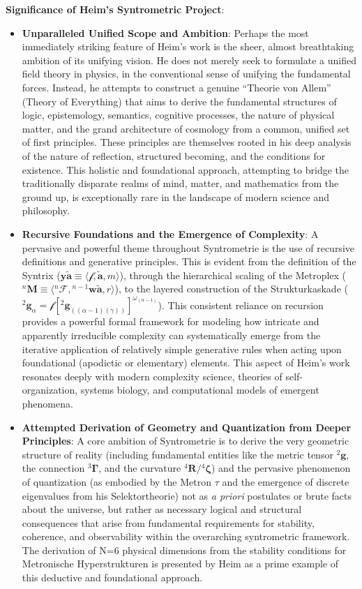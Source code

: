 \documentclass[12pt]{article}
\newcommand{\syntrix}{\bm{y\widetilde{a}}}
\newcommand{\metrophor}{\bm{\widetilde{a}}}
\newcommand{\synkolator}{\mathcal{f}}
\newcommand{\synkolationsstufe}{m}
\newcommand{\metroplex}[1]{{}^{#1}\mathbf{M}}
\newcommand{\hypermetrophor}[1]{{}^{#1}\mathbf{w\widetilde{a}}}
\newcommand{\metroplexsynkolator}[1]{{}^{#1}\mathcal{F}}
\newcommand{\kompositionsfeld}{{}^2\mathbf{g}}
\newcommand{\partialstruktur}[1]{{}^2\mathbf{g}_{(#1)}} %
\newcommand{\fundamentalkondensor}{{}^3\bm{\Gamma}}
\newcommand{\metron}{\tau}
\newcommand{\strukturkompressor}{{}^4\bm{\zeta}}
\begin{document}
\textbf{Significance of Heim's Syntrometric Project}:
\begin{itemize}
    \item \textbf{Unparalleled Unified Scope and Ambition}: Perhaps the most immediately striking feature of Heim's work is the sheer, almost breathtaking ambition of its unifying vision. He does not merely seek to formulate a unified field theory in physics, in the conventional sense of unifying the fundamental forces. Instead, he attempts to construct a genuine \enquote{Theorie von Allem} (Theory of Everything) that aims to derive the fundamental structures of logic, epistemology, semantics, cognitive processes, the nature of physical matter, and the grand architecture of cosmology from a common, unified set of first principles. These principles are themselves rooted in his deep analysis of the nature of reflection, structured becoming, and the conditions for existence. This holistic and foundational approach, attempting to bridge the traditionally disparate realms of mind, matter, and mathematics from the ground up, is exceptionally rare in the landscape of modern science and philosophy.
    \item \textbf{Recursive Foundations and the Emergence of Complexity}: A pervasive and powerful theme throughout Syntrometrie is the use of recursive definitions and generative principles. This is evident from the definition of the Syntrix (\( \syntrix \equiv \langle \synkolator, \metrophor, \synkolationsstufe \rangle \)), through the hierarchical scaling of the Metroplex (\( \metroplex{n} \equiv \langle \metroplexsynkolator{n}, \hypermetrophor{n-1}, r \rangle \)), to the layered construction of the Strukturkaskade (\( \kompositionsfeld_\alpha = \mathcal{f}[\partialstruktur{(\alpha-1)(\gamma)}]^{\omega_{(\alpha-1)}} \)). This consistent reliance on recursion provides a powerful formal framework for modeling how intricate and apparently irreducible complexity can systematically emerge from the iterative application of relatively simple generative rules when acting upon foundational (apodictic or elementary) elements. This aspect of Heim's work resonates deeply with modern complexity science, theories of self-organization, systems biology, and computational models of emergent phenomena.
    \item \textbf{Attempted Derivation of Geometry and Quantization from Deeper Principles}: A core ambition of Syntrometrie is to derive the very geometric structure of reality (including fundamental entities like the metric tensor \( \kompositionsfeld \), the connection \( \fundamentalkondensor \), and the curvature \( {}^4\mathbf{R}/\strukturkompressor \)) and the pervasive phenomenon of quantization (as embodied by the Metron \( \metron \) and the emergence of discrete eigenvalues from his Selektortheorie) not as \textit{a priori} postulates or brute facts about the universe, but rather as necessary logical and structural consequences that arise from fundamental requirements for stability, coherence, and observability within the overarching syntrometric framework. The derivation of N=6 physical dimensions from the stability conditions for Metronische Hyperstrukturen is presented by Heim as a prime example of this deductive and foundational approach.

\end{itemize}
\end{document}
